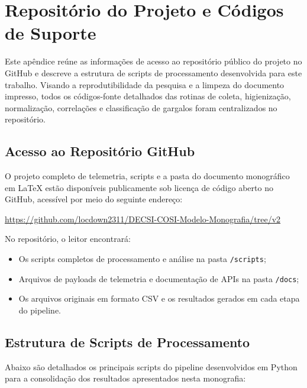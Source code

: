 \chapter{Repositório do Projeto e Códigos de Suporte}
\label{ap:repositorio_projeto}

Este apêndice reúne as informações de acesso ao repositório público do projeto no GitHub e descreve a estrutura de scripts de processamento desenvolvida para este trabalho. Visando a reprodutibilidade da pesquisa e a limpeza do documento impresso, todos os códigos-fonte detalhados das rotinas de coleta, higienização, normalização, correlações e classificação de gargalos foram centralizados no repositório.

\section{Acesso ao Repositório GitHub}

O projeto completo de telemetria, scripts e a pasta do documento monográfico em LaTeX estão disponíveis publicamente sob licença de código aberto no GitHub, acessível por meio do seguinte endereço:
\begin{center}
    \url{https://github.com/locdown2311/DECSI-COSI-Modelo-Monografia/tree/v2}
\end{center}

No repositório, o leitor encontrará:
\begin{itemize}
    \item Os scripts completos de processamento e análise na pasta \texttt{/scripts};
    \item Arquivos de payloads de telemetria e documentação de APIs na pasta \texttt{/docs};
    \item Os arquivos originais em formato CSV e os resultados gerados em cada etapa do pipeline.
\end{itemize}

\section{Estrutura de Scripts de Processamento}

Abaixo são detalhados os principais scripts do pipeline desenvolvidos em Python para a consolidação dos resultados apresentados nesta monografia:

